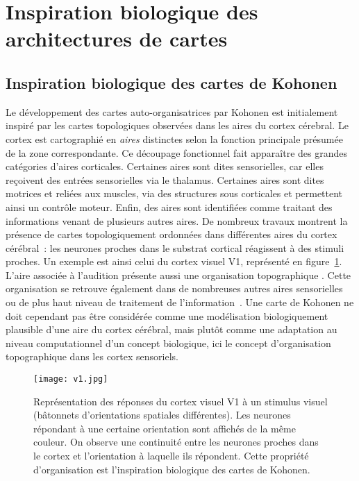 \documentclass[../main]{subfiles}
\begin{document}
\section{Inspiration biologique des architectures de cartes}\label{sec:bioinspi}

\subsection{Inspiration biologique des cartes de Kohonen}

Le développement des cartes auto-organisatrices par Kohonen est initialement inspiré par les cartes topologiques observées dans les aires du cortex cérebral. 
Le cortex est cartographié en \emph{aires} distinctes selon la fonction principale présumée de la zone correspondante.
Ce découpage fonctionnel fait apparaître des grandes catégories d'aires corticales. 
Certaines aires sont dites sensorielles, car elles reçoivent des entrées sensorielles via le thalamus. Certaines aires sont dites motrices et reliées aux muscles, via des structures sous corticales et permettent ainsi un contrôle moteur.
Enfin, des aires sont identifiées comme traitant des informations venant de plusieurs autres aires.
De nombreux travaux montrent la présence de cartes topologiquement ordonnées dans différentes aires du cortex cérébral~: les neurones proches dans le substrat cortical réagissent à des stimuli proches. 
Un exemple est ainsi celui du cortex visuel V1, représenté en figure~\ref{fig:v1}. 
L'aire associée à l'audition présente aussi une organisation topographique \parencite{Reale1980TonotopicOI}. Cette organisation se retrouve également dans de nombreuses autres aires sensorielles ou de plus haut niveau de traitement de l'information~\parencite{Kohonen1995SelfOrganizingM}. 
Une carte de Kohonen ne doit cependant pas être considérée comme une modélisation biologiquement plausible d'une aire du cortex cérébral, mais plutôt comme une adaptation au niveau computationnel d'un concept biologique, ici le concept d'organisation topographique dans les cortex sensoriels.

\begin{figure}
\centering
\texttt{[image: v1.jpg]}
\caption{Représentation des réponses du cortex visuel V1 à un stimulus visuel (bâtonnets d'orientations spatiales différentes). Les neurones répondant à une certaine orientation sont affichés de la même couleur. On observe une continuité entre les neurones proches dans le cortex et l'orientation à laquelle ils répondent. Cette propriété d'organisation est l'inspiration biologique des cartes de Kohonen.\label{fig:v1}}
\end{figure}
\end{document}

